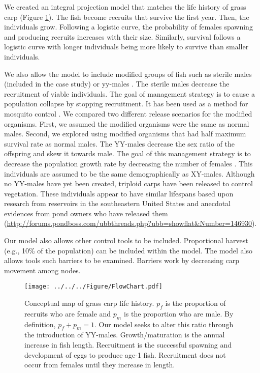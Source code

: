 \documentclass{article}[12pt]
\begin{document}
We created an integral projection model that matches the life history of grass carp (Figure \ref{fig:cMap}).
The fish become recruits that survive the first year.
Then, the individuals grow. 
Following a logistic curve, the probability of females spawning and producing recruits increases with their size. 
Similarly, survival follows a logistic curve with longer individuals being more likely to survive than smaller individuals.

We also allow the model to include modified groups of fish such as sterile males (included in the case study) or yy-males \citep[previously described in][]{Erickson:2017ecomod}.
The sterile males decrease the recruitment of viable individuals.
The goal of management strategy is to cause a population collapse by stopping recruitment. 
It has been used as a method for mosquito control \citep[e.g.,][]{benedict2003first}.
We compared two different release scenarios for the modified organisms.
First, we assumed the modified organisms were the same as normal males.
Second, we explored using modified organisms that had half maximum survival rate as normal males.
The YY-males decrease the sex ratio of the offspring and skew it towards male.
The goal of this management strategy is to decrease the population growth rate by decreasing the number of females \citep{schill2016production}. 
This individuals are assumed to be the same demographically as XY-males.
Although no YY-males have yet been created, triploid carps have been released to control vegetation.
These individuals appear to have similar lifespans based upon research from reservoirs in the southeastern United States \citep{kirk2003longevity} and anecdotal evidences from pond owners who have released them (\url{http://forums.pondboss.com/ubbthreads.php?ubb=showflat&Number=146930}).

Our model also allows other control tools to be included.
Proportional harvest (e.g., 10\% of the population) can be included within the model.
The model also allows tools such barriers to be examined.
Barriers work by decreasing carp movement among nodes.


\begin{figure}[htbp]
	\centering
	\texttt{[image: ../../../Figure/FlowChart.pdf]} 
	   \caption{Conceptual map of grass carp life history. \(p_f\) is the proportion of recruits who are female and \(p_m\) is the proportion who are male. By definition, \(p_f + p_m = 1\).  Our model seeks to alter this ratio through the introduction of YY-males. Growth/maturation is the annual increase in fish length. Recruitment is the successful spawning and development of eggs to produce age-1 fish. Recruitment does not occur from females until they increase in length.}
   \label{fig:cMap}
\end{figure}
\end{document}
